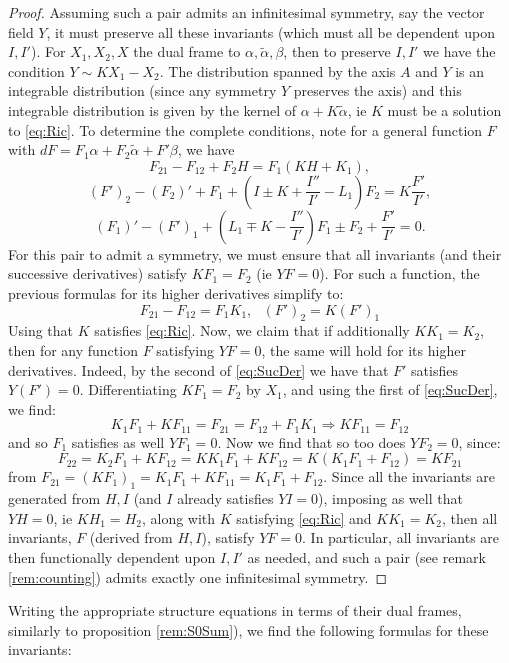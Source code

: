 \documentclass[10pt]{amsart}
\newcommand{\so}{\Rightarrow}
\theoremstyle{definition}
\begin{document}
\begin{proof}
    Assuming such a pair admits an infinitesimal symmetry, say the vector field $Y$, it must preserve all these invariants (which must all be dependent upon $I, I'$). For $X_1, X_2, X$ the dual frame to $\alpha, \tilde\alpha, \beta$, then to preserve $I, I'$ we have the condition $Y\sim KX_1 - X_2$. The distribution spanned by the axis $A$ and $Y$ is an integrable distribution (since any symmetry $Y$ preserves the axis) and this integrable distribution is given by the kernel of $\alpha + K\tilde\alpha$, ie $K$ must be a solution to \eqref{eq:Ric}. To determine the complete conditions, note for a general function $F$ with $dF = F_1\alpha + F_2 \tilde\alpha + F'\beta$, we have
    \[ F_{21} - F_{12} + F_2H = F_1 (KH + K_1), \]
    \[ (F')_2 - (F_2)' + F_1 + \left(I \pm K + \frac{I''}{I'} - L_1\right)F_2 = K \frac{F'}{I'},\]
    \[ (F_1)' - (F')_1 + \left( L_1 \mp K - \frac{I''}{I'} \right)F_1 \pm  F_2 + \frac{F'}{I'} = 0. \]
    For this pair to admit a symmetry, we must ensure that all invariants (and their successive derivatives) satisfy $KF_1 = F_2$ (ie $YF = 0$). For such a function, the previous formulas for its higher derivatives simplify to:
    \begin{equation}\label{eq:SucDer}
        F_{21} - F_{12} = F_1K_1, ~~~ (F')_2 = K(F')_1
    \end{equation}
    Using that $K$ satisfies \eqref{eq:Ric}. Now, we claim that if additionally $K K_1 = K_2$, then for any function $F$ satisfying $YF = 0$, the same will hold for its higher derivatives. Indeed, by the second of \eqref{eq:SucDer}  we have that $F'$ satisfies $Y(F') = 0$. Differentiating $KF_1 = F_2$ by $X_1$, and using the first of \eqref{eq:SucDer}, we find:
    \[ K_1F_1 + KF_{11} = F_{21} = F_{12} + F_1K_1 \so KF_{11} = F_{12} \]
    and so $F_1$ satisfies as well $YF_1 = 0$. Now we find that so too does $YF_2 = 0$, since:
   \[ F_{22} = K_2F_1 + K F_{12} = KK_1 F_1 + K F_{12} = K ( K_1F_1 + F_{12}) = KF_{21} \]
   from $F_{21} = (KF_1)_1 = K_1 F_1 + K F_{11} = K_1 F_1 + F_{12}$. Since all the invariants are generated from $H, I$ (and $I$ already satisfies $YI= 0$), imposing as well that $YH = 0$, ie $KH_1 = H_2$, along with $K$ satisfying \eqref{eq:Ric} and $KK_1 = K_2$, then all invariants, $F$ (derived from $H,I$), satisfy $YF = 0$. In particular, all invariants are then functionally dependent upon $I, I'$ as needed, and such a pair (see remark \ref{rem:counting}) admits exactly one infinitesimal symmetry.
\end{proof}

Writing the appropriate structure equations in terms of their dual frames, similarly to proposition \ref{rem:S0Sum}), we find the following formulas for these invariants:
\end{document}
